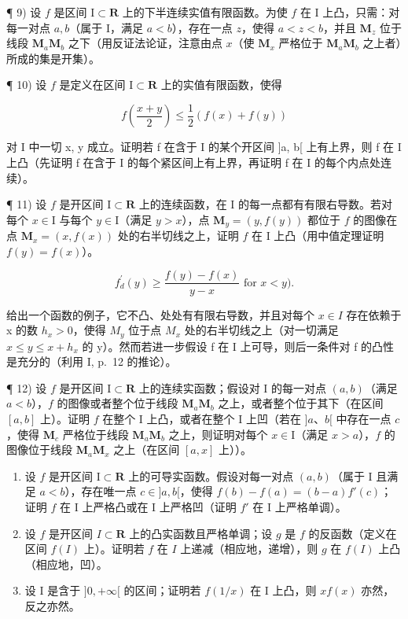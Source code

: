 ¶ 9) 设 \(f\) 是区间 \(\mathrm{I} \subset \mathbf{R}\) 上的下半连续实值有限函数。为使 \(f\) 在 \(\mathrm{I}\) 上凸，只需：对每一对点 \(a, b\)（属于 \(\mathrm{I}\)，满足 \(a < b\)），存在一点 \(z\)，使得 \(a < z < b\)，并且 \(\mathbf{M}_z\) 位于线段 \(\mathbf{M}_a\mathbf{M}_b\) 之下（用反证法论证，注意由点 \(x\)（使 \(\mathbf{M}_x\) 严格位于 \(\mathbf{M}_a\mathbf{M}_b\) 之上者）所成的集是开集）。

¶ 10) 设 \(f\) 是定义在区间 \(\mathrm{I}\subset \mathbf{R}\) 上的实值有限函数，使得

\[
f \left(\frac {x + y}{2}\right) \leqslant \frac {1}{2} (f (x) + f (y))
\]

对 I 中一切 x, y 成立。证明若 f 在含于 I 的某个开区间 {]}a, b{[} 上有上界，则 f 在 I 上凸（先证明 f 在含于 I 的每个紧区间上有上界，再证明 f 在 I 的每个内点处连续）。

¶ 11) 设 \(f\) 是开区间 \(\mathrm{I} \subset \mathbf{R}\) 上的连续函数，在 \(\mathrm{I}\) 的每一点都有有限右导数。若对每个 \(x \in \mathrm{I}\) 与每个 \(y \in \mathrm{I}\)（满足 \(y > x\)），点 \(\mathbf{M}_y = (y, f(y))\) 都位于 \(f\) 的图像在点 \(\mathbf{M}_x = (x, f(x))\) 处的右半切线之上，证明 \(f\) 在 \(\mathrm{I}\) 上凸（用中值定理证明 \(f(y) = f(x)\)）。

\[
f _ {d} ^ {\prime} (y) \geqslant \frac {f (y) - f (x)}{y - x} \text {   for   } x <   y).
\]

给出一个函数的例子，它不凸、处处有有限右导数，并且对每个 \(x \in I\) 存在依赖于 x 的数 \(h_{x} > 0\)，使得 \(M_{y}\) 位于点 \(M_{x}\) 处的右半切线之上（对一切满足 \(x \leqslant y \leqslant x + h_{x}\) 的 y）。然而若进一步假设 f 在 I 上可导，则后一条件对 f 的凸性是充分的（利用 I, p.~12 的推论）。

¶ 12) 设 \(f\) 是开区间 \(\mathrm{I}\subset \mathbf{R}\) 上的连续实函数；假设对 I 的每一对点 \((a,b)\)（满足 \(a < b\)），\(f\) 的图像或者整个位于线段 \(\mathbf{M}_a\mathbf{M}_b\) 之上，或者整个位于其下（在区间 \([a,b]\) 上）。证明 \(f\) 在整个 I 上凸，或者在整个 I 上凹（若在 \(]a\)、\(b[\) 中存在一点 \(c\)，使得 \(\mathbf{M}_c\) 严格位于线段 \(\mathbf{M}_a\mathbf{M}_b\) 之上，则证明对每个 \(x\in \mathrm{I}\)（满足 \(x > a\)），\(f\) 的图像位于线段 \(\mathbf{M}_a\mathbf{M}_x\) 之上（在区间 \([a,x]\) 上））。

\begin{enumerate}
\def\labelenumi{\arabic{enumi})}
\setcounter{enumi}{12}
\item
  设 \(f\) 是开区间 \(\mathrm{I} \subset \mathbf{R}\) 上的可导实函数。假设对每一对点 \((a, b)\)（属于 \(\mathrm{I}\) 且满足 \(a < b\)），存在唯一点 \(c \in ]a, b[\)，使得 \(f(b) - f(a) = (b - a)f'(c)\)；证明 \(f\) 在 \(\mathrm{I}\) 上严格凸或在 \(\mathrm{I}\) 上严格凹（证明 \(f'\) 在 \(\mathrm{I}\) 上严格单调）。
\item
  设 \(f\) 是开区间 \(I \subset \mathbf{R}\) 上的凸实函数且严格单调；设 \(g\) 是 \(f\) 的反函数（定义在区间 \(f(I)\) 上）。证明若 \(f\) 在 \(I\) 上递减（相应地，递增），则 \(g\) 在 \(f(I)\) 上凸（相应地，凹）。
\item
  设 I 是含于 \(]0, +\infty[\) 的区间；证明若 \(f(1 / x)\) 在 I 上凸，则 \(xf(x)\) 亦然，反之亦然。
\end{enumerate}

